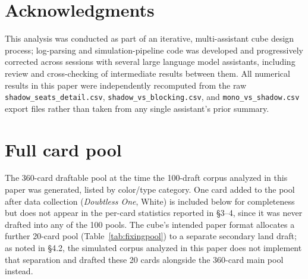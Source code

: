 \documentclass[11pt]{article}
\begin{document}
\section*{Acknowledgments}
This analysis was conducted as part of an iterative, multi-assistant cube design
process; log-parsing and simulation-pipeline code was developed and progressively
corrected across sessions with several large language model assistants, including
review and cross-checking of intermediate results between them. All numerical
results in this paper were independently recomputed from the raw
\texttt{shadow\_seats\_detail.csv}, \texttt{shadow\_vs\_blocking.csv}, and
\texttt{mono\_vs\_shadow.csv} export files rather than taken from any single
assistant's prior summary.

\clearpage
\appendix
\section{Full card pool}
\label{app:cardpool}

The 360-card draftable pool at the time the 100-draft corpus analyzed in this paper was generated, listed by color/type category. One card added to the pool after data collection (\emph{Doubtless One}, White) is included below for completeness but does not appear in the per-card statistics reported in \S3--4, since it was never drafted into any of the 100 pools. The cube's intended paper format allocates a further 20-card pool (Table~\ref{tab:fixingpool}) to a separate secondary land draft; as noted in \S4.2, the simulated corpus analyzed in this paper does not implement that separation and drafted these 20 cards alongside the 360-card main pool instead.
\end{document}
